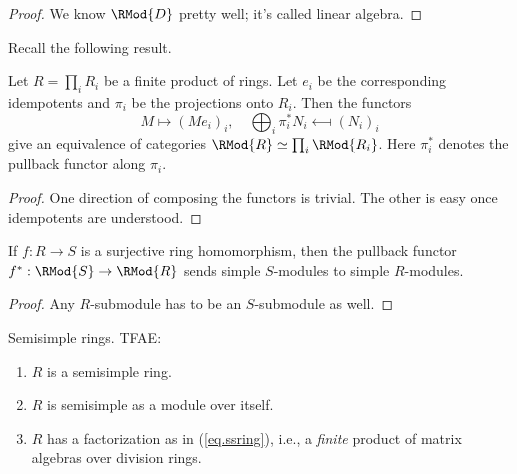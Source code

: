 \documentclass{article}
\begin{document}
\begin{proof}
    We know $\RMod{D}$ pretty well; it's called linear algebra.
\end{proof}

Recall the following result.
\begin{proposition}\label{prop.prodRings}
    Let $R=\prod_{i}R_i$ be a finite product of rings. Let $e_i$ be the corresponding idempotents and $\pi_i$ be the projections onto $R_i$. 
    Then the functors
    \begin{equation*}
        M \longmapsto (Me_i)_i,\quad 
        \bigoplus_{i}\pi_i^*N_i \longmapsfrom (N_i)_i
    \end{equation*}
    give an equivalence of categories $\RMod{R}\simeq\prod_{i}\RMod{R_i}$.
    Here $\pi_i^*$ denotes the pullback functor along $\pi_i$.
\end{proposition}

\begin{proof}
    One direction of composing the functors is trivial.
    The other is easy once idempotents are understood.
\end{proof}

\begin{lemma}
    If $f:R\to S$ is a surjective ring homomorphism, then the pullback functor $f^*:\RMod{S}\to\RMod{R}$ sends simple $S$-modules to simple $R$-modules.
\end{lemma}

\begin{proof}
    Any $R$-submodule has to be an $S$-submodule as well.
\end{proof}

\begin{theorem}\label{thm.ssring}
    Semisimple rings. TFAE:
    \begin{enumerate}[nosep]
        \item $R$ is a semisimple ring.
        \item $R$ is semisimple as a module over itself.
        \item $R$ has a factorization as in (\ref{eq.ssring}), i.e., a \emph{finite} product of matrix algebras over division rings.
    \end{enumerate}
\end{theorem}
\end{document}
